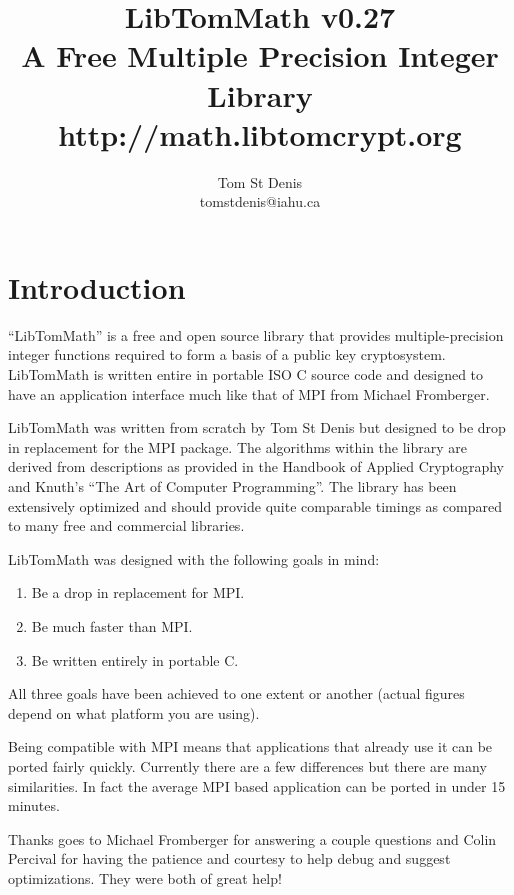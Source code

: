 \documentclass[]{article}
\begin{document}
\title{LibTomMath v0.27 \\ A Free Multiple Precision Integer Library \\ http://math.libtomcrypt.org }
\author{Tom St Denis \\ tomstdenis@iahu.ca}
\maketitle
\newpage

\section{Introduction}
``LibTomMath'' is a free and open source library that provides multiple-precision integer functions required to form a 
basis of a public key cryptosystem.  LibTomMath is written entire in portable ISO C source code and designed to have an 
application interface much like that of MPI from Michael Fromberger.  

LibTomMath was written from scratch by Tom St Denis but designed to be  drop in replacement for the MPI package.  The 
algorithms within the library are derived from descriptions as provided in the Handbook of Applied Cryptography and Knuth's
``The Art of Computer Programming''.  The library has been extensively optimized and should provide quite comparable 
timings as compared to many free and commercial libraries.

LibTomMath was designed with the following goals in mind:
\begin{enumerate}
\item Be a drop in replacement for MPI.
\item Be much faster than MPI.
\item Be written entirely in portable C.
\end{enumerate}

All three goals have been achieved to one extent or another (actual figures depend on what platform you are using).

Being compatible with MPI means that applications that already use it can be ported fairly quickly.  Currently there are 
a few differences but there are many similarities.  In fact the average MPI based application can be ported in under 15
minutes.  

Thanks goes to Michael Fromberger for answering a couple questions and Colin Percival for having the patience and courtesy to
help debug and suggest optimizations.  They were both of great help!
\end{document}
